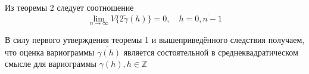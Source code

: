 \begin{Corollary}
	Из теоремы 2 следует соотношение
	\begin{equation*}
		\lim_{n \to \infty} V\{ 2 \tilde{\gamma}(h) \} = 0, \quad h = \overline{0, n - 1}
	\end{equation*}
\end{Corollary}

\begin{Remark}
	В силу первого утверждения теоремы 1 и вышеприведённого следствия получаем, что оценка вариограммы $ \tilde{\gamma(h)} $ является состоятельной в среднеквадратическом смысле для вариограммы $ \gamma(h), h \in \mathbb{Z} $
\end{Remark}

